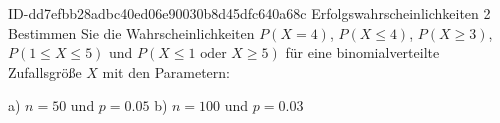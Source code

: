 \begin{exercise}
      {ID-dd7efbb28adbc40ed06e90030b8d45dfc640a68c}
      {Erfolgswahrscheinlichkeiten 2}
  \ifproblem\problem
    Bestimmen Sie die Wahrscheinlichkeiten $P(X=4)$, $P(X\leq4)$, $P(X\geq3)$,
    $P(1\leq X\leq5)$ und $P(X\leq1\text{ oder } X\geq5)$ für eine
    binomialverteilte Zufallsgröße $X$ mit den Parametern:
    \begin{center}
      a) $n=50$ und $p=\num{0.05}$
      \quad\quad\quad
      b) $n=100$ und $p=\num{0.03}$
    \end{center}
  \fi
\end{exercise}
